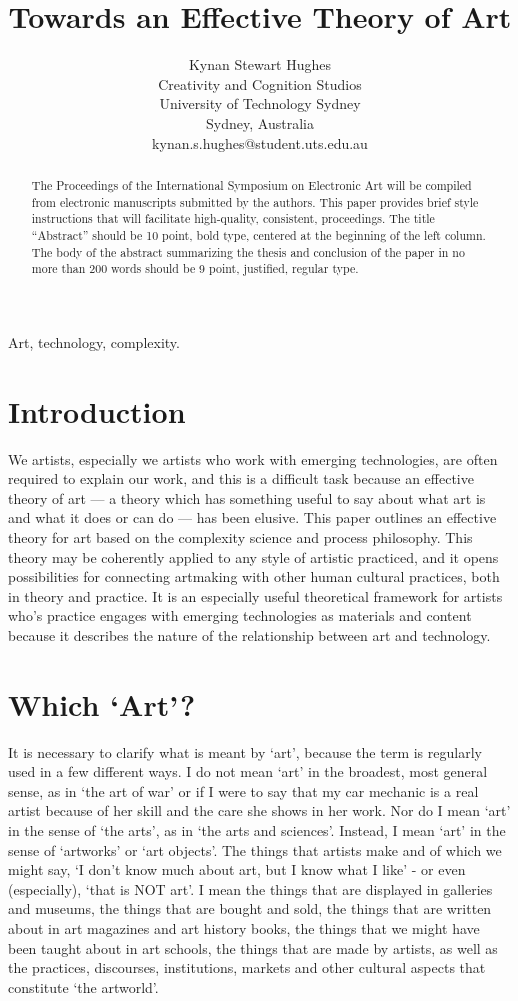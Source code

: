\documentclass[letterpaper]{article}
\title{Towards an Effective Theory of Art}
\author{Kynan Stewart Hughes\\
Creativity and Cognition Studios\\
University of Technology Sydney\\
Sydney, Australia\\
kynan.s.hughes@student.uts.edu.au\\
\newline
\newline
}
\begin{document}
 
\maketitle
\begin{abstract}
The Proceedings of the International Symposium on Electronic
Art will be compiled from electronic manuscripts submitted by
the authors. This paper provides brief style instructions that will
facilitate high-quality, consistent, proceedings. The title
``Abstract'' should be 10 point, bold type, centered at the
beginning of the left column. The body of the abstract
summarizing the thesis and conclusion of the paper in no more
than 200 words should be 9 point, justified, regular type.
\end{abstract}


Art, technology, complexity.

\section{Introduction}

We artists, especially we artists who work with emerging technologies, are often required to explain our work, and this is a difficult task because an effective theory of art — a theory which has something useful to say about what art is and what it does or can do — has been elusive. This paper outlines an effective theory for art based on the complexity science and process philosophy. This theory may be coherently applied to any style of artistic practiced, and it opens possibilities for connecting artmaking with other human cultural practices, both in theory and practice. It is an especially useful theoretical framework for artists who's practice engages with emerging technologies as materials and content because it describes the nature of the relationship between art and technology. 

\section{Which ‘Art’?}

It is necessary to clarify what is meant by ‘art’, because the term is regularly used in a few different ways. I do not mean ‘art’ in the broadest, most general sense, as in ‘the art of war’ or if I were to say that my car mechanic is a real artist because of her skill and the care she shows in her work. Nor do I mean ‘art’ in the sense of ‘the arts’, as in ‘the arts and sciences’. Instead, I mean ‘art’ in the sense of ‘artworks’ or ‘art objects’. The things that artists make and of which we might say, ‘I don't know much about art, but I know what I like’ - or even (especially), ‘that is NOT art’. I mean the things that are displayed in galleries and museums, the things that are bought and sold, the things that are written about in art magazines and art history books, the things that we might have been taught about in art schools, the things that are made by artists, as well as the practices, discourses, institutions, markets and other cultural aspects that constitute ‘the artworld’.
\end{document}
